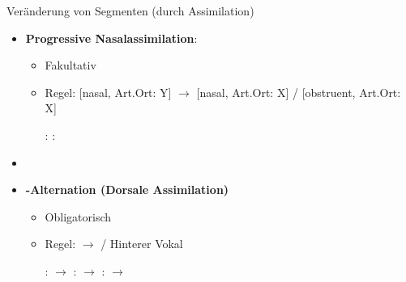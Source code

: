 
\begin{frame}
{Veränderung von Segmenten (durch Assimilation)}

\begin{itemize}
	\item \textbf{Progressive Nasalassimilation}:

	\begin{itemize}
		\item Fakultativ
		\item Regel: [nasal, Art.Ort: Y] $\rightarrow$ [nasal, Art.Ort: X] /  [obstruent, Art.Ort: X] \underline{\quad} 

	\eal
		\ex {}:  \ras 
		\textipa{[ha:k\textsyllabic{n}]} \ras \textipa{[ha:k\textsyllabic{N}]}
		\ex {}:  \ras 
		\textipa{[SU\.p\textsyllabic{n}]} \ras \textipa{[SU\.p\textsyllabic{m}]}
	\zl
	
	\end{itemize}

	\item[]
	\item \textbf{\textipa{[\c{c}]/[x]}-Alternation (Dorsale Assimilation)}

	\begin{itemize}
		\item Obligatorisch
		\item Regel:  $\rightarrow$ \textipa{[x]} / Hinterer Vokal \underline{\quad}

	\eal
		\ex {}:  $\rightarrow$ \textipa{[mI\c{c}]}
		\ex {}:  $\rightarrow$ \textipa{[bUx]}
		\ex {}:  $\rightarrow$ \textipa{[PEl\c{c}]}
	\zl
	
	\end{itemize}		

\end{itemize}

\end{frame}




